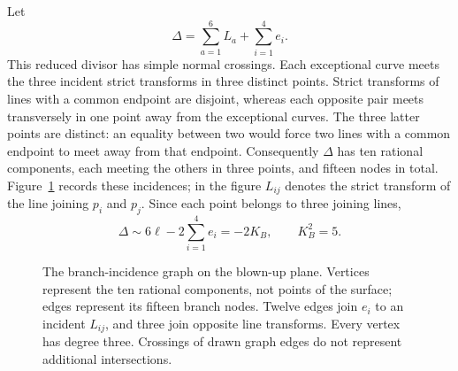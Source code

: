 Let
\[
 \Delta=\sum_{a=1}^6 L_a+\sum_{i=1}^4e_i.
\]
This reduced divisor has simple normal crossings.  Each exceptional curve
meets the three incident strict transforms in three distinct points.
Strict transforms of lines with a common endpoint are disjoint, whereas
each opposite pair meets transversely in one point away from the
exceptional curves.  The three latter points are distinct: an equality
between two would force two lines with a common endpoint to meet away
from that endpoint.  Consequently $\Delta$ has ten rational components,
each meeting the others in three points, and fifteen nodes in total.
Figure~\ref{fig:branch-incidence} records these incidences; in the
figure $L_{ij}$ denotes the strict transform of the line joining
$p_i$ and $p_j$.
Since each point belongs to three joining lines,
\begin{equation}\label{eq:branch-class}
 \Delta\sim6\ell-2\sum_{i=1}^4e_i=-2K_B,
 \qquad K_B^2=5.
\end{equation}

\begin{figure}[htbp]
\centering
{}
\caption{The branch-incidence graph on the blown-up plane.
Vertices represent the ten rational components, not points of the
surface; edges represent its fifteen branch nodes. Twelve edges join
$e_i$ to an incident $L_{ij}$, and three join opposite line transforms.
Every vertex has degree three. Crossings of drawn graph edges do not
represent additional intersections.}
\label{fig:branch-incidence}
\end{figure}

